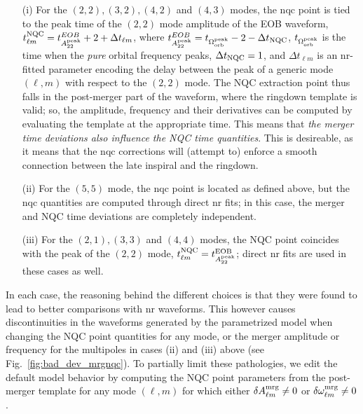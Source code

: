 \documentclass[prd,amssymb,amsmath,amsfonts,nofootinbib,reprint,showpacs,longbibliography]{revtex4-1}
\newcommand{\amrg}[1]{{A_{#1}^{\rm mrg}}}
\newcommand{\omgmrg}[1]{{\omega_{#1}^{\rm mrg}}}
\begin{document}
\begin{itemize}

\item[(i)] For the $(2,2), (3,2), (4,2)$ and $(4,3)$ modes, the \ac{nqc} point is tied to the peak time of the $(2,2)$
mode amplitude of the EOB waveform, $t_{\ell m}^{\rm NQC} = t_{A_{22}^{\rm peak}}^{EOB} + 2 + \Delta t_{\ell m}$, 
where $t_{A_{22}^{\rm peak}}^{EOB} = t_{\Omega_{\rm orb}^{\rm peak}} - 2 - \Delta t_{\rm NQC}$, $t_{\Omega_{\rm orb}^{\rm peak}}$
is the time when the \textit{pure} orbital frequency peaks, $\Delta t_{\rm NQC} = 1$, and $\Delta t_{\ell m}$ is an \ac{nr}-fitted parameter
encoding the delay between the peak of a generic mode $(\ell, m)$ with respect to the $(2,2)$ mode.
The NQC extraction point thus falls in the post-merger part of the waveform, where the ringdown
template is valid; so, the amplitude, frequency and their derivatives can be computed by evaluating the
template at the appropriate time. This means that \textit{the merger time deviations also influence the NQC time
quantities}. This is desireable, as it means that the \ac{nqc} corrections will (attempt to) enforce a smooth
connection between the late inspiral and the ringdown.
\item[(ii)] For the $(5,5)$ mode, the \ac{nqc} point is located as defined above, but the \ac{nqc} quantities
are computed through direct \ac{nr} fits; in this case, the merger and NQC time deviations are completely independent.
\item[(iii)] For the $(2,1), (3,3)$ and $(4,4)$ modes, the NQC point coincides
with the peak of the $(2,2)$ mode, $t_{\ell m}^{\rm NQC} = t_{A_{22}^{\rm peak}}^{\rm EOB}$; direct \ac{nr} fits 
are used in these cases as well.
\end{itemize}

In each case, the reasoning behind the different choices is that they were found to lead to better comparisons
with \ac{nr} waveforms. This however causes discontinuities in the waveforms generated by the parametrized
model when changing the NQC point quantities for any mode, or the merger amplitude or frequency for the
multipoles in cases (ii) and (iii) above (see Fig.~\ref{fig:bad_dev_mrgnqc}). 
To partially limit these pathologies, we edit the default model behavior by computing the NQC point
parameters from the post-merger template for any mode $(\ell, m)$ for which either
$\delta \amrg{\ell m} \neq 0$ or $\delta \omgmrg{\ell m} \neq 0$.
\end{document}
